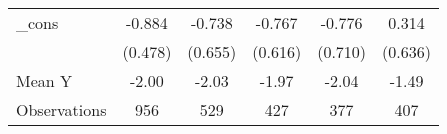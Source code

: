 {\begin{tabular}{l*{5}{c}}
\addlinespace
\_cons      &      -0.884\sym{*}  &      -0.738         &      -0.767         &      -0.776         &       0.314         \\
            &     (0.478)         &     (0.655)         &     (0.616)         &     (0.710)         &     (0.636)         \\
\midrule
Mean Y      &       -2.00         &       -2.03         &       -1.97         &       -2.04         &       -1.49         \\
Observations&         956         &         529         &         427         &         377         &         407         \\
\bottomrule
\end{tabular}
}
